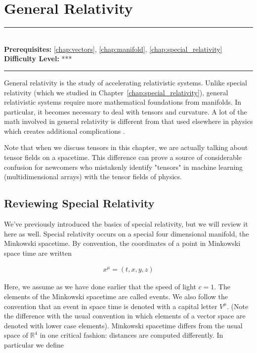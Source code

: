 \documentclass[book.tex]{subfiles}
\begin{document}
\chapter{General Relativity}

\label{chap:gr}
\noindent\rule{11cm}{0.4pt} \\
\textbf{Prerequisites:} \autoref{chap:vectors}, \autoref{chap:manifold}, \autoref{chap:special_relativity}  \\
\textbf{Difficulty Level:} *** \\
\noindent\rule{11cm}{0.4pt}
\vspace{5mm}

General relativity is the study of accelerating relativistic systems. Unlike special relativity (which we studied in Chapter~\ref{chap:special_relativity}), general relativistic systems require more mathematical foundations from manifolds. In particular, it becomes necessary to deal with tensors and curvature. A lot of the math involved in general relativity is different from that used elsewhere in physics which creates additional complications \cite{carroll2001no}.

Note that when we discuss tensors in this chapter, we are actually talking about tensor fields on a spacetime. This difference can prove a source of considerable confusion for newcomers who mistakenly identify "tensors" in machine learning (multidimensional arrays) with the tensor fields of physics.

\section{Reviewing Special Relativity}

We've previously introduced the basics of special relativity, but we will review it here as well. Special relativity occurs on a special four dimensional manifold, the Minkowski spacetime. By convention, the coordinates of a point in Minkowski space time are written

\begin{align}
    x^{\mu} = (t, x, y, z)
\end{align}

Here, we assume as we have done earlier that the speed of light $c = 1$. The elements of the Minkowski spacetime are called events. We also follow the convention that an event in space time is denoted with a capital letter $V^{\mu}$. (Note the difference with the usual convention in which elements of a vector space are denoted with lower case elements). Minkowski spacetime differs from the usual space of $\mathbb{R}^4$ in one critical fashion: distances are computed differently. In particular we define
\end{document}
